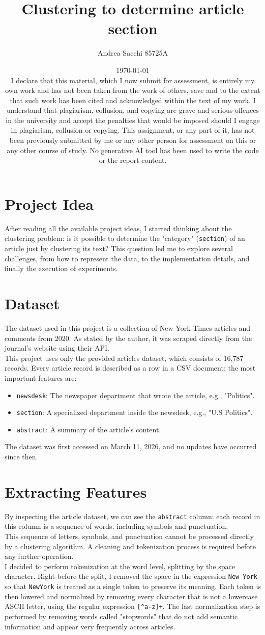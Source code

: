 \documentclass{report}
\title{Clustering to determine article section}
\author{Andrea Sacchi 85725A}
\date{\today\\I declare that this material, which I now submit for assessment, is entirely my own work and has not been taken from the work of others, save and to the extent that such work has been cited and acknowledged within the text of my work. I understand that plagiarism, collusion, and copying are grave and serious offences in the university and accept the penalties that would be imposed should I engage in plagiarism, collusion or copying. This assignment, or any part of it, has not been previously submitted by me or any other person for assessment on this or any other course of study. No generative AI tool has been used to write the code or the report content.}
\begin{document}
\maketitle

\section{Project Idea}
After reading all the available project ideas, I started thinking about the clustering problem: is it possible to determine the "category" (\verb|section|) of an article just by clustering its text? This question led me to explore several challenges, from how to represent the data, to the implementation details, and finally the execution of experiments.

\section{Dataset}
The dataset used in this project is a collection of New York Times articles and comments from 2020. As stated by the author, it was scraped directly from the journal's website using their API. 
\\
This project uses only the provided articles dataset, which consists of 16,787 records. Every article record is described as a row in a CSV document; the most important features are:
\begin{itemize}
    \item \verb|newsdesk|: The newspaper department that wrote the article, e.g., "Politics".
    \item \verb|section|: A specialized department inside the newsdesk, e.g., "U.S Politics".
    \item \verb|abstract|: A summary of the article's content.
\end{itemize}
The dataset was first accessed on March 11, 2026, and no updates have occurred since then.

\section{Extracting Features}
By inspecting the article dataset, we can see the \verb|abstract| column: each record in this column is a sequence of words, including symbols and punctuation. 
\\
This sequence of letters, symbols, and punctuation cannot be processed directly by a clustering algorithm. A cleaning and tokenization process is required before any further operation.
\\
I decided to perform tokenization at the word level, splitting by the space character. Right before the split, I removed the space in the expression \verb|New York| so that \verb|NewYork| is treated as a single token to preserve its meaning.
Each token is then lowered and normalized by removing every character that is not a lowercase ASCII letter, using the regular expression \verb|[^a-z]+|.
The last normalization step is performed by removing words called "stopwords" that do not add semantic information and appear very frequently across articles. 
\end{document}
